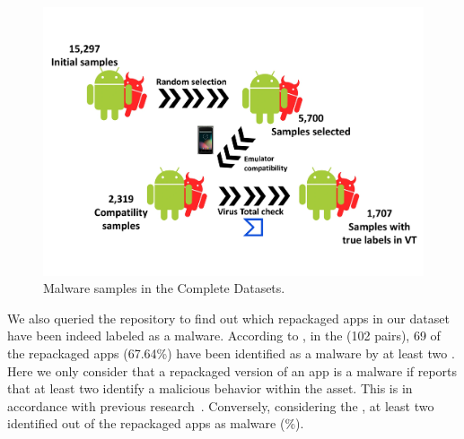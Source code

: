  \begin{figure}
  \includegraphics[width=\columnwidth]{images/dataset.pdf}
  \caption{Malware samples in the Complete Datasets.}
  \label{fig:dataset}
\end{figure}




We also queried the \vt repository to find out which repackaged apps in our
dataset have been indeed labeled as a malware.
According to \vt, in the \sds (102 pairs),
69 of the repackaged apps (67.64\%) have been identified as a malware by at least two
\ses. Here we only consider that a repackaged version of an app is a malware if \vt reports that at least
two \ses identify a malicious behavior within the asset. This is in accordance with previous research~\cite{vt-label,DBLP:journals/ese/KhanmohammadiEH19}. Conversely, considering the \cds, at least two \se identified \malwares out of the \apps repackaged apps as malware (\malwaresP\%).

